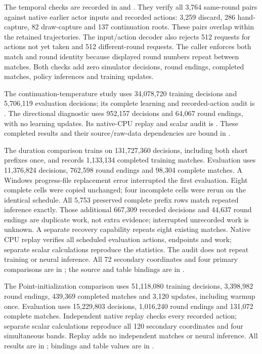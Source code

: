 The temporal checks are recorded in
 and
. They verify all 3,764
same-round pairs against native earlier actor inputs and recorded actions:
3,259 discard, 286 hand-capture, 82 draw-capture and 137 continuation roots.
These pairs overlap within the retained trajectories. The input/action decoder
also rejects 512 requests for actions not yet taken and 512 different-round
requests. The caller enforces both match and round identity because displayed
round numbers repeat between matches. Both checks add zero simulator decisions,
round endings, completed matches, policy inferences and training updates.

The continuation-temperature study uses 34,078,720 training decisions and
5,706,119 evaluation decisions; its complete learning and recorded-action audit
is .
The directional diagnostic uses 952,157 decisions and 64,067 round endings,
with no learning updates. Its native-CPU replay and scalar audit is
. These completed results
and their source/raw-data dependencies are bound in
.

The duration comparison trains on 131,727,360 decisions, including both short
prefixes once, and records 1,133,134 completed training matches. Evaluation uses
11,376,824 decisions, 762,598 round endings and 98,304 complete matches.
A Windows progress-file replacement error interrupted the first evaluation.
Eight complete cells were copied unchanged; four incomplete cells were rerun
on the identical schedule. All 5,753 preserved complete prefix rows match
repeated inference exactly. Those additional 667,309 recorded decisions and
44,637 round endings are duplicate work, not extra evidence; interrupted
unrecorded work is unknown. A separate recovery capability repeats eight
existing matches. Native CPU replay verifies all scheduled evaluation actions,
endpoints and work; separate scalar calculations reproduce the statistics.
The audit does not repeat training or neural inference. All 72 secondary
coordinates and four primary comparisons are in
; the source and table bindings are in
.


The Point-initialization comparison uses 51,118,080 training decisions,
3,398,982 round endings, 439,369 completed matches and 3,120 updates, including
warmup once. Evaluation uses 15,229,803 decisions, 1,016,240 round endings and
131,072 complete matches. Independent native replay checks every recorded
action; separate scalar calculations reproduce all 120 secondary coordinates
and four simultaneous bands. Replay adds no independent matches or neural
inference. All results are in ;
bindings and table values are in
.

